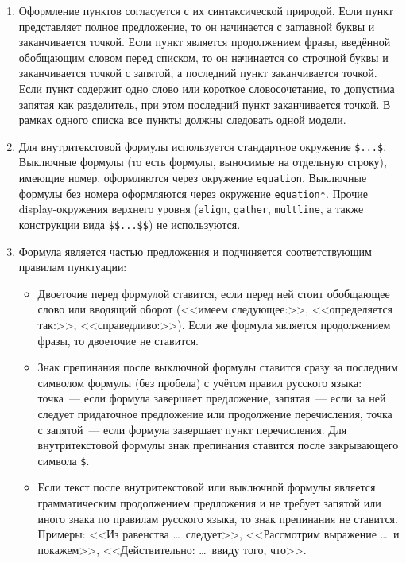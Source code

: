 \begin{enumerate}
    \item {}
        Оформление пунктов согласуется с их синтаксической природой.
        Если пункт представляет полное предложение, то он начинается с заглавной
                буквы и заканчивается точкой.
        Если пункт является продолжением фразы, введённой обобщающим словом перед списком, то он начинается со строчной буквы и заканчивается точкой с запятой, а последний пункт заканчивается точкой.
        Если пункт содержит одно слово или короткое словосочетание, то допустима запятая как разделитель, при этом последний пункт заканчивается точкой.
        В рамках одного списка все пункты должны следовать одной модели.

    \item {}
        Для внутритекстовой формулы используется стандартное окружение \verb|$...$|.
        Выключные формулы (то есть формулы, выносимые на отдельную строку), имеющие номер, оформляются через окружение \verb|equation|.
        Выключные формулы без номера оформляются через окружение \verb|equation*|.
        Прочие display-окружения верхнего уровня (\verb|align|, \verb|gather|, \verb|multline|, а также конструкции вида \verb|$$...$$|) не используются.

    \item {}
        Формула является частью предложения и подчиняется соответствующим правилам пунктуации:
        \begin{itemize}
            \item Двоеточие перед формулой ставится, если перед ней стоит обобщающее слово или вводящий оборот (<<имеем следующее:>>, <<определяется так:>>, <<справедливо:>>).
                Если же формула является продолжением фразы, то двоеточие не ставится.
            \item Знак препинания после выключной формулы ставится сразу за последним символом формулы (без пробела) с учётом правил русского языка: точка~--- если формула завершает предложение, запятая~--- если за ней следует придаточное предложение или продолжение перечисления, точка с запятой~--- если формула завершает пункт перечисления.
                Для внутритекстовой формулы знак препинания ставится после закрывающего символа \verb|$|.
            \item Если текст после внутритекстовой или выключной формулы является грамматическим продолжением предложения и не требует запятой или иного знака по правилам русского языка, то знак препинания не ставится.
                Примеры: <<Из равенства \ldots\ следует>>, <<Рассмотрим выражение \ldots\ и покажем>>, <<Действительно: \ldots\ ввиду того, что>>.
        \end{itemize}


\end{enumerate}
